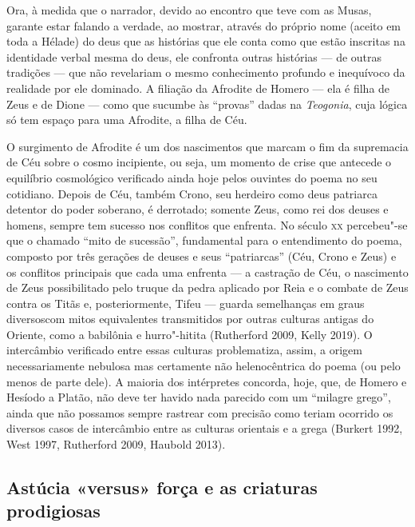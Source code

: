 Ora, à medida que o narrador, devido ao encontro que teve com as Musas,
garante estar falando a verdade, ao mostrar, através do próprio nome
(aceito em toda a Hélade) do deus que as histórias que ele conta como
que estão inscritas na identidade verbal mesma do deus, ele confronta
outras histórias --- de outras tradições --- que não revelariam o mesmo
conhecimento profundo e inequívoco da realidade por ele dominado. A
filiação da Afrodite de Homero --- ela é filha de Zeus e de Dione --- como
que sucumbe às ``provas'' dadas na \emph{Teogonia}, cuja lógica só tem
espaço para uma Afrodite, a filha de Céu.

O surgimento de Afrodite é um dos nascimentos que marcam o fim da
supremacia de Céu sobre o cosmo incipiente, ou seja, um momento de crise
que antecede o equilíbrio cosmológico verificado ainda hoje pelos
ouvintes do poema no seu cotidiano. Depois de Céu, também Crono, seu
herdeiro como deus patriarca detentor do poder soberano, é derrotado;
somente Zeus, como rei dos deuses e homens, sempre tem sucesso nos
conflitos que enfrenta. No século \textsc{xx} percebeu"-se que o chamado ``mito de
sucessão'', fundamental para o entendimento do poema, composto por três
gerações de deuses e seus ``patriarcas'' (Céu, Crono e Zeus) e os
conflitos principais que cada uma enfrenta --- a castração de Céu, o
nascimento de Zeus possibilitado pelo truque da pedra aplicado por Reia
e o combate de Zeus contra os Titãs e, posteriormente, Tifeu --- guarda
semelhanças em graus diversoscom mitos equivalentes transmitidos por
outras culturas antigas do Oriente, como a babilônia e hurro"-hitita
(Rutherford 2009, Kelly 2019). O intercâmbio verificado entre essas
culturas problematiza, assim, a origem necessariamente nebulosa mas
certamente não helenocêntrica do poema (ou pelo menos de parte dele). A
maioria dos intérpretes concorda, hoje, que, de Homero e Hesíodo a
Platão, não deve ter havido nada parecido com um ``milagre grego'',
ainda que não possamos sempre rastrear com precisão como teriam ocorrido
os diversos casos de intercâmbio entre as culturas orientais e a grega
(Burkert 1992, West 1997, Rutherford 2009, Haubold 2013).

\subsection{Astúcia «versus» força e as criaturas prodigiosas}

